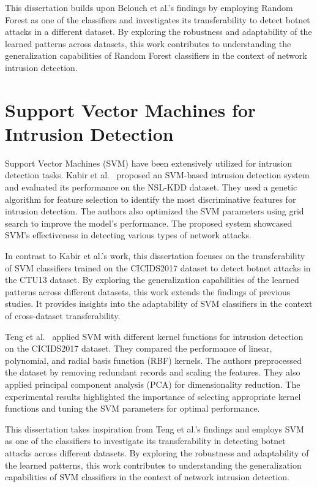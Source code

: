 This dissertation builds upon Belouch et al.’s findings by employing Random Forest as one of the classifiers and investigates its transferability to detect botnet attacks in a different dataset. By exploring the robustness and adaptability of the learned patterns across datasets, this work contributes to understanding the generalization capabilities of Random Forest classifiers in the context of network intrusion detection.

\section{Support Vector Machines for Intrusion Detection}

Support Vector Machines (SVM) have been extensively utilized for intrusion detection tasks. Kabir et al.~\cite{kabir2017network} proposed an SVM-based intrusion detection system and evaluated its performance on the NSL-KDD dataset. They used a genetic algorithm for feature selection to identify the most discriminative features for intrusion detection. The authors also optimized the SVM parameters using grid search to improve the model’s performance. The proposed system showcased SVM’s effectiveness in detecting various types of network attacks.

In contrast to Kabir et al.’s work, this dissertation focuses on the transferability of SVM classifiers trained on the CICIDS2017 dataset to detect botnet attacks in the CTU13 dataset. By exploring the generalization capabilities of the learned patterns across different datasets, this work extends the findings of previous studies. It provides insights into the adaptability of SVM classifiers in the context of cross-dataset transferability.

Teng et al.~\cite{teng2017svm} applied SVM with different kernel functions for intrusion detection on the CICIDS2017 dataset. They compared the performance of linear, polynomial, and radial basis function (RBF) kernels. The authors preprocessed the dataset by removing redundant records and scaling the features. They also applied principal component analysis (PCA) for dimensionality reduction. The experimental results highlighted the importance of selecting appropriate kernel functions and tuning the SVM parameters for optimal performance.

This dissertation takes inspiration from Teng et al.’s findings and employs SVM as one of the classifiers to investigate its transferability in detecting botnet attacks across different datasets. By exploring the robustness and adaptability of the learned patterns, this work contributes to understanding the generalization capabilities of SVM classifiers in the context of network intrusion detection.

